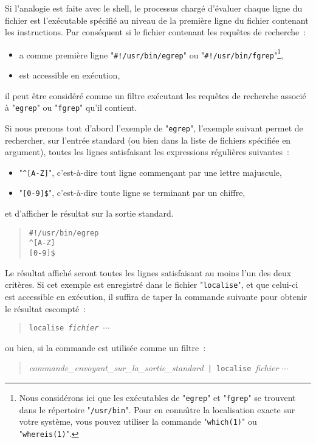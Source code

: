 Si l'analogie est faite avec le shell, le processus charg{\'e} d'{\'e}valuer chaque
ligne du fichier est l'ex{\'e}cutable sp{\'e}cifi{\'e} au niveau de la premi{\`e}re
ligne du fichier contenant les instructions. Par cons{\'e}quent si le fichier
contenant les requ{\^e}tes de recherche~:
\begin{itemize}
	\item	a comme premi{\`e}re ligne "\verb=#!/usr/bin/egrep=" ou
			"\verb=#!/usr/bin/fgrep="\footnote{Nous
			consid{\'e}rons ici que les ex{\'e}cutables de "{\tt egrep}" et
			"{\tt fgrep}" se trouvent dans
			le r{\'e}pertoire "{\tt /usr/bin}". Pour en conna{\^\i}tre la
			localisation exacte sur votre syst{\`e}me, vous pouvez utiliser
			la commande "{\tt which(1)}" ou "{\tt whereis(1)}".},
	\item	est accessible en ex{\'e}cution,
\end{itemize}
il peut {\^e}tre consid{\'e}r{\'e} comme un filtre ex{\'e}cutant les requ{\^e}tes de
recherche associ{\'e} {\`a} "{\tt egrep}" ou "{\tt fgrep}" qu'il contient.

Si nous prenons tout d'abord l'exemple de "{\tt egrep}", l'exemple suivant
permet de rechercher, sur l'entr{\'e}e standard (ou bien dans la liste de fichiers
sp{\'e}cifi{\'e}e en argument), toutes les lignes satisfaisant les expressions r{\'e}guli{\`e}res
suivantes~:
\begin{itemize}
	\item	"\verb=^[A-Z]=", c'est-{\`a}-dire tout ligne commen\c{c}ant par une lettre
			majuscule,
	\item	"\verb=[0-9]$=", c'est-{\`a}-dire toute ligne se terminant par un
			chiffre,
\end{itemize}
et d'afficher le r{\'e}sultat sur la sortie standard.
\begin{quote}
\begin{verbatim}
#!/usr/bin/egrep
^[A-Z]
[0-9]$
\end{verbatim}
\end{quote}

Le r{\'e}sultat affich{\'e} seront toutes les lignes satisfaisant au moins l'un des
deux crit{\`e}res. Si cet exemple est enregistr{\'e} dans le fichier "{\tt localise}",
et que celui-ci est accessible en ex{\'e}cution, il suffira de taper la commande
suivante pour obtenir le r{\'e}sultat escompt{\'e}~:
\begin{quote}
{\tt localise~{\sl fichier $\cdots$}}
\end{quote}
ou bien, si la commande est utilis{\'e}e comme un filtre~:
\begin{quote}
{\sl commande\_envoyant\_sur\_la\_sortie\_standard}~\verb=| localise=~{\sl fichier $\cdots$}
\end{quote}

